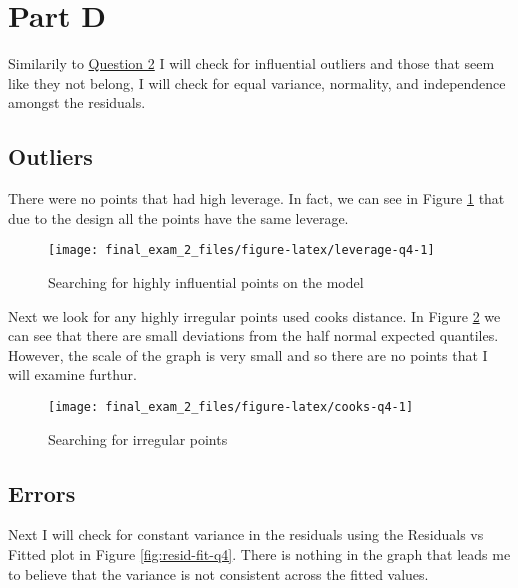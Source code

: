 \documentclass[]{book}
\begin{document}
\hypertarget{part-d-3}{%
\section{Part D}\label{part-d-3}}

Similarily to \protect\hyperlink{question-2}{Question 2} I will check for influential outliers and those that seem like they not belong, I will check for equal variance, normality, and independence amongst the residuals.

\hypertarget{outliers-1}{%
\subsection{Outliers}\label{outliers-1}}

There were no points that had high leverage. In fact, we can see in Figure \ref{fig:leverage-q4} that due to the design all the points have the same leverage.

\begin{figure}

{\centering \texttt{[image: final\_exam\_2\_files/figure-latex/leverage-q4-1]} 

}

\caption{Searching for highly influential points on the model}\label{fig:leverage-q4}
\end{figure}

Next we look for any highly irregular points used cooks distance. In Figure \ref{fig:cooks-q4} we can see that there are small deviations from the half normal expected quantiles. However, the scale of the graph is very small and so there are no points that I will examine furthur.

\begin{figure}

{\centering \texttt{[image: final\_exam\_2\_files/figure-latex/cooks-q4-1]} 

}

\caption{Searching for irregular points}\label{fig:cooks-q4}
\end{figure}

\hypertarget{errors-1}{%
\subsection{Errors}\label{errors-1}}

Next I will check for constant variance in the residuals using the Residuals vs Fitted plot in Figure \ref{fig:resid-fit-q4}. There is nothing in the graph that leads me to believe that the variance is not consistent across the fitted values.
\end{document}
